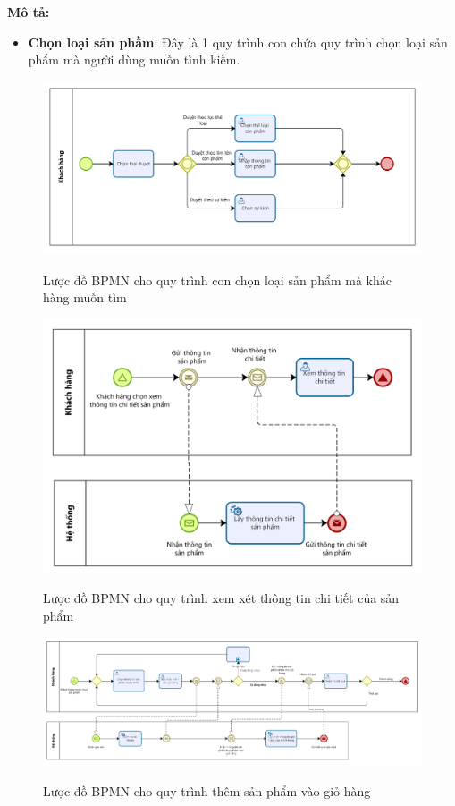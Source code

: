     \textbf{Mô tả:}
    \begin{itemize}
        \item \textbf{Chọn loại sản phầm}: Đây là 1 quy trình con chứa quy trình chọn loại sản phẩm mà người dùng muốn tình kiếm.
    \end{itemize}
    \begin{figure}[!htp]
        \centering
        \includegraphics[width=12cm]{img/BPMN/customer_buy/customer_select_type.png}
        \label{4}
        \newline
        \caption{Lược đồ BPMN cho quy trình con chọn loại sản phẩm mà khác hàng muốn tìm}
    \end{figure}
    \begin{figure}[!htp]
        \centering
        \includegraphics[width=12cm]{img/BPMN/customer_buy/customer_product_detail.png}
        \label{4}
        \newline
        \caption{Lược đồ BPMN cho quy trình xem xét thông tin chi tiết của sản phẩm}
    \end{figure}
    \begin{figure}[!htp]
        \centering
        \includegraphics[width=17cm]{img/BPMN/customer_buy/customer_add_to_card.png}
        \label{4}
        \newline
        \caption{Lược đồ BPMN cho quy trình thêm sản phẩm vào giỏ hàng}
    \end{figure}  
